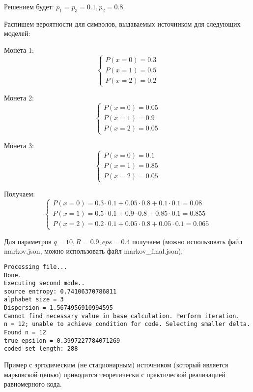 \documentclass{article}
\begin{document}
Решением будет: $p_1 = p_3 = 0.1, p_2 = 0.8$.

Распишем вероятности для символов, выдаваемых источником для следующих моделей:

Монета 1:
\begin{equation*}
\begin{cases}
P(x = 0) = 0.3\\
P(x = 1) = 0.5\\
P(x = 2) = 0.2
\end{cases}
\end{equation*}

Монета 2:
\begin{equation*}
\begin{cases}
P(x = 0) = 0.05\\
P(x = 1) = 0.9\\
P(x = 2) = 0.05
\end{cases}
\end{equation*}

Монета 3:
\begin{equation*}
\begin{cases}
P(x = 0) = 0.1\\
P(x = 1) = 0.85\\
P(x = 2) = 0.05
\end{cases}
\end{equation*}

Получаем:
\begin{equation*}
\begin{cases}
P(x = 0) = 0.3 \cdot 0.1 + 0.05 \cdot 0.8 + 0.1 \cdot 0.1 = 0.08\\
P(x = 1) = 0.5 \cdot 0.1 + 0.9 \cdot 0.8 + 0.85 \cdot 0.1 = 0.855\\
P(x = 2) = 0.2 \cdot 0.1 + 0.05 \cdot 0.8 + 0.05 \cdot 0.1 = 0.065
\end{cases}
\end{equation*}

Для параметров $q = 10, R = 0.9, eps = 0.4$ получаем (можно использовать файл markov.json, можно использовать файл markov\_final.json):

\begin{verbatim}
Processing file...
Done.
Executing second mode..
source entropy: 0.74106370786811
alphabet size = 3
Dispersion = 1.5674956910994595
Cannot find necessary value in base calculation. Perform iteration.
n = 12; unable to achieve condition for code. Selecting smaller delta.
Found n = 12
true epsilon = 0.3997227784071269
coded set length: 288
\end{verbatim}

Пример с эргодическим (не стационарным) источником (который является марковской цепью) приводится теоретически с практической реализацией равномерного кода.
\end{document}

